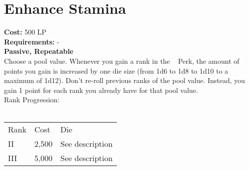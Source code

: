 \section{Enhance Stamina}\label{sec:enhanceStamina}
\textbf{Cost:} 500 LP\\
\textbf{Requirements:} -\\
\textbf{Passive, Repeatable}\\
Choose a pool value.
Whenever you gain a rank in the ~ Perk, the amount of points you gain is increased by one die size (from 1d6 to 1d8 to 1d10 to a maximum of 1d12).
Don't re-roll previous ranks of the pool value.
Instead, you gain 1 point for each rank you already have for that pool value.
\\
Rank Progression:\\
\\
\begin{tabular}{l | l | p{12cm} }
    Rank & Cost & Die\\
    II & 2,500 & See description \\
    III & 5,000 & See description \\
\end{tabular}